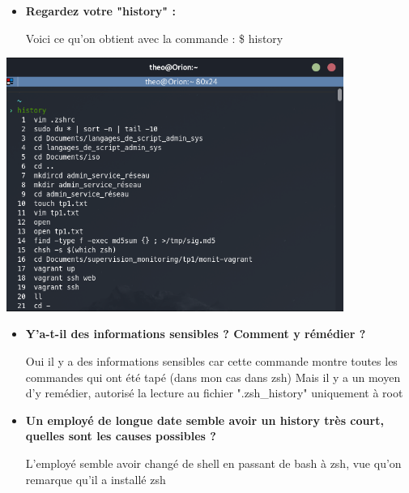 \documentclass[12pt]{article}
\begin{document}
\begin{itemize}
  \item \textbf{Regardez votre "history" :}

  \vspace{0.3cm}

  Voici ce qu'on obtient avec la commande : \$ history
\end{itemize}
\vspace{0.3cm}

\includegraphics[width=11cm]{screen-term-td4.png}
\vspace{0.3cm}

\begin{itemize}
  \item \textbf{Y'a-t-il des informations sensibles ? Comment y rémédier ?}

  \vspace{0.3cm}

  Oui il y a des informations sensibles car cette commande montre toutes les commandes qui ont été tapé (dans mon cas dans zsh) \newline
  Mais il y a un moyen d'y remédier, autorisé la lecture au fichier ".zsh\_history" uniquement à root
\end{itemize}
\vspace{0.3cm}

\begin{itemize}
  \item \textbf{Un employé de longue date semble avoir un history très court, quelles sont les causes possibles ?}

  \vspace{0.3cm}

  L'employé semble avoir changé de shell en passant de bash à zsh, vue qu'on remarque qu'il a installé zsh
\end{itemize}
\vspace{0.3cm}
\end{document}
